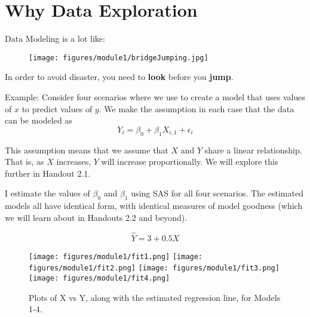 \documentclass[12pt]{notes}
\begin{document}

\section{Why Data Exploration}

Data Modeling is a lot like:

\begin{figure}[H]
\centering
\texttt{[image: figures/module1/bridgeJumping.jpg]}
\end{figure}

In order to avoid disaster, you need to \textbf{look} before you \textbf{jump}.

\nspace
Example: 
Consider four scenarios where we use to create a model that uses values of $x$ to predict values of $y$. We make the assumption in each case that the data can be modeled as 
\begin{equation}
Y_i = \beta_0 + \beta_1X_{i,1} + \epsilon_i
\end{equation}

This assumption means that we assume that $X$ and $Y$ share a linear relationship. That is, as $X$ increases, $Y$ will increase proportionally. We will explore this further in Handout 2.1.

I estimate the values of $\beta_0$ and $\beta_1$ using SAS for all four scenarios. The estimated models all have identical form, with identical measures of model goodness (which we will learn about in Handouts 2.2 and beyond). 

\[\hat{Y} = 3 + 0.5X\]


\begin{figure}[H]
\texttt{[image: figures/module1/fit1.png]}
\texttt{[image: figures/module1/fit2.png]}
\texttt{[image: figures/module1/fit3.png]}
\texttt{[image: figures/module1/fit4.png]}
\caption{Plots of X vs Y, along with the estimated regression line, for Models 1-4.}
\label{fitplots}
\end{figure}

\begin{minipage}[l][3cm][c]{\textwidth}
\end{minipage}
\end{document}
